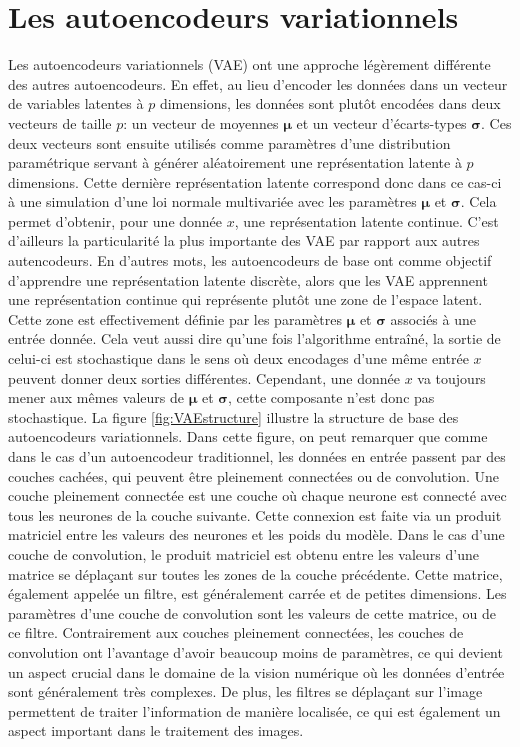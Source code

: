 \section{Les autoencodeurs variationnels} \label{background-vae}

Les autoencodeurs variationnels (VAE)  \cite{kingma2013autoencoding} ont une approche légèrement différente des autres autoencodeurs. En effet, au lieu d'encoder les données dans un vecteur de variables latentes à $p$ dimensions, les données sont plutôt encodées dans deux vecteurs de taille $p$: un vecteur de moyennes $\boldsymbol \mu$ et un vecteur d'écarts-types $\boldsymbol \sigma$. Ces deux vecteurs sont ensuite utilisés comme paramètres d'une distribution paramétrique servant à générer aléatoirement une représentation latente à $p$ dimensions. Cette dernière représentation latente correspond donc dans ce cas-ci à une simulation d'une loi normale multivariée avec les paramètres $\boldsymbol \mu$ et $\boldsymbol \sigma$. Cela permet d'obtenir, pour une donnée $x$, une représentation latente continue. C'est d'ailleurs la particularité la plus importante des VAE par rapport aux autres autencodeurs. En d'autres mots, les autoencodeurs de base ont comme objectif d'apprendre une représentation latente discrète, alors que les VAE apprennent une représentation continue qui représente plutôt une zone de l'espace latent. Cette zone est effectivement définie par les paramètres $\boldsymbol \mu$ et $\boldsymbol \sigma$ associés à une entrée donnée. Cela veut aussi dire qu'une fois l'algorithme entraîné, la sortie de celui-ci est stochastique dans le sens où deux encodages d'une même entrée $x$ peuvent donner deux sorties différentes. Cependant, une donnée $x$ va toujours mener aux mêmes valeurs de $\boldsymbol \mu$ et $\boldsymbol \sigma$, cette composante n'est donc pas stochastique. La figure \ref{fig:VAEstructure} illustre la structure de base des autoencodeurs variationnels. Dans cette figure, on peut remarquer que comme dans le cas d'un autoencodeur traditionnel, les données en entrée passent par des couches cachées, qui peuvent être pleinement connectées ou de convolution. Une couche pleinement connectée est une couche où chaque neurone est connecté avec tous les neurones de la couche suivante. Cette connexion est faite via un produit matriciel entre les valeurs des neurones et les poids du modèle. Dans le cas d'une couche de convolution, le produit matriciel est obtenu entre les valeurs d'une matrice se déplaçant sur toutes les zones de la couche précédente. Cette matrice, également appelée un filtre, est généralement carrée et de petites dimensions. Les paramètres d'une couche de convolution sont les valeurs de cette matrice, ou de ce filtre. Contrairement aux couches pleinement connectées, les couches de convolution ont l'avantage d'avoir beaucoup moins de paramètres, ce qui devient un aspect crucial dans le domaine de la vision numérique où les données d'entrée sont généralement très complexes. De plus, les filtres se déplaçant sur l'image permettent de traiter l'information de manière localisée, ce qui est également un aspect important dans le traitement des images.

